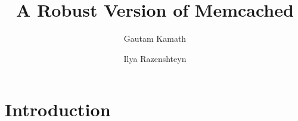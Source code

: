 \documentclass[letterpaper,11pt]{article}
\begin{document}
    \title{A Robust Version of Memcached}
    \author{Gautam Kamath \and Ilya Razenshteyn}
    \maketitle

    \section{Introduction}




\end{document}
